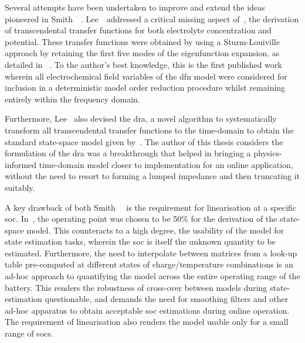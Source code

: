 Several attempts have been undertaken to  improve and extend the ideas pioneered
in  Smith~\etal{}~\cite{Smith2007}.  Lee~\etal{}~addressed  a  critical  missing
aspect  of~\cite{Smith2007}, \viz{}  the derivation  of transcendental  transfer
functions  for  both electrolyte  concentration  and  potential. These  transfer
functions were  obtained by  using a Sturm-Louiville  approach by  retaining the
first five modes of the eigenfunction expansion, as detailed in~\cite{Lee2012} .
To the  author's best knowledge,  this is the  first published work  wherein all
electrochemical  field variables  of  the \gls{dfn}  model  were considered  for
inclusion in  a deterministic model  order reduction procedure  whilst remaining
entirely within the frequency domain. 

Furthermore,  Lee~\etal{}   also  devised  the  \gls{dra},   a  novel  algorithm
to  systematically  transform  all  transcendental  transfer  functions  to  the
time-domain to  obtain the standard state-space  model given by~\cite{Lee2012a}.
The  author of  this thesis  considers the  formulation of  the \gls{dra}  was a
breakthrough that helped in bringing a physics-informed time-domain model closer
to  implementation for  an online  application, without  the need  to resort  to
forming a lumped impedance and then truncating it suitably.



A key  drawback of  both Smith~\etal{}~\cite{Smith2007}  is the  requirement for
linearisation at a specific  \gls{soc}. In~\cite{Smith2007}, the operating point
was  chosen  to be  50\%  for  the derivation  of  the  state-space model.  This
counteracts to  a high degree, the  usability of the model  for state estimation
tasks, wherein  the \gls{soc} is  itself the  unknown quantity to  be estimated.
Furthermore,  the need  to interpolate  between  matrices from  a look-up  table
pre-computed at different states of charge/temperature combinations is an ad-hoc
approach  to quantifying  the model  across the  entire operating  range of  the
battery.  This  renders  the  robustness of  cross-over  between  models  during
state-estimation questionable,  and demands the  need for smoothing  filters and
other ad-hoc apparatus to obtain  acceptable \gls{soc} estimations during online
operation. The requirement  of linearisation also renders the  model usable only
for a small range of \gls{soc}s.

